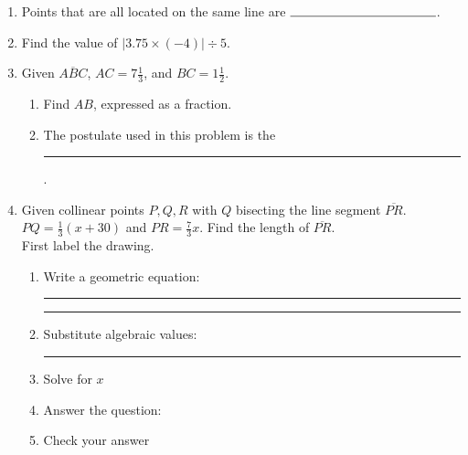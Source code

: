 \documentclass[12pt, oneside]{article}
\begin{document}
\begin{enumerate}
      \item Points that are all located on the same line are $\rule{4cm}{0.15mm}$.
      \item Find the value of $|3.75 \times (-4)| \div 5$. \vspace{1cm}

      \item Given $\overline{ABC}$, $AC=7 \frac{1}{3}$, and $BC=1 \frac{1}{2}$.
      \begin{enumerate}
        \item Find ${AB}$, expressed as a fraction.\\[0.75cm]
           \bigskip
        \item The postulate used in this problem is the \rule{6cm}{0.15mm}.
      \end{enumerate}
      \newpage

      \item Given collinear points $P, Q, R$ with $Q$ bisecting the line segment $\overline{PR}$. $PQ=\frac{1}{3} (x+30)$ and $PR = \frac{7}{3} x$. Find the length of $\overline{PR}$.\\ \bigskip
      First label the drawing.
      \begin{flushright}
      \end{flushright}
      \vspace{1cm}
      \begin{enumerate}
        \item Write a geometric equation: \rule{4cm}{0.15mm} \hspace{1cm} \rule{4cm}{0.15mm}
        \vspace{.7cm}
        \item Substitute algebraic values: \rule{4cm}{0.15mm}
        \item Solve for $x$
        \vspace{4.5cm}
        \item Answer the question:
        \vspace{2.5cm}
        \item Check your answer
      \end{enumerate}

\end{enumerate}
\end{document}
